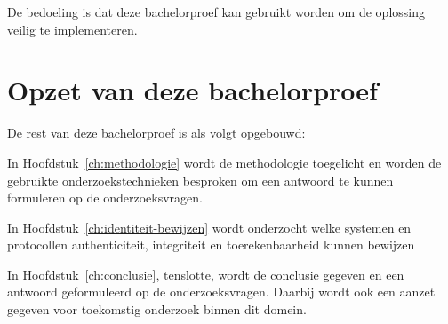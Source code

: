De bedoeling is dat deze bachelorproef kan gebruikt worden om de oplossing
veilig te implementeren.

\section{Opzet van deze bachelorproef}
\label{sec:opzet-bachelorproef}


De rest van deze bachelorproef is als volgt opgebouwd:

In Hoofdstuk~\ref{ch:methodologie} wordt de methodologie toegelicht en worden de
gebruikte onderzoekstechnieken besproken om een antwoord te kunnen formuleren op
de onderzoeksvragen.


In Hoofdstuk~\ref{ch:identiteit-bewijzen} wordt onderzocht welke systemen en
protocollen authenticiteit, integriteit en toerekenbaarheid kunnen bewijzen


In Hoofdstuk~\ref{ch:conclusie}, tenslotte, wordt de conclusie gegeven en een
antwoord geformuleerd op de onderzoeksvragen. Daarbij wordt ook een aanzet
gegeven voor toekomstig onderzoek binnen dit domein.
